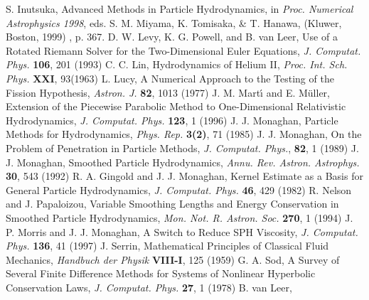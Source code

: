 \documentclass{cjour}
\begin{document}
\begin{article}
\begin{references}
 S. Inutsuka, 
              Advanced Methods in Particle Hydrodynamics, 
                 in {\it Proc. Numerical Astrophysics 1998}, 
                 eds. S. M. Miyama, K. Tomisaka, \& T. Hanawa, 
                 (Kluwer, Boston, 1999) , p. 367. 
 D. W. Levy, K. G. Powell, and B. van Leer,
                Use of a Rotated Riemann Solver for the 
                Two-Dimensional Euler Equations, 
                 {\it J. Computat. Phys.} {\bf 106}, 201 (1993)
 C. C. Lin, 
                Hydrodynamics of Helium II,  
                {\it Proc. Int. Sch. Phys.} {\bf XXI}, 93(1963) 
 L. Lucy, 
                A Numerical Approach to the Testing of 
                the Fission Hypothesis, 
                 {\it Astron. J.} {\bf 82}, 1013 (1977)
 J. M. Mart\'{\i} and E. M\"{u}ller, 
                Extension of the Piecewise Parabolic Method to 
                One-Dimensional Relativistic Hydrodynamics, 
                 {\it J. Computat. Phys.} {\bf 123}, 1 (1996)
 J. J. Monaghan, 
                 Particle Methods for Hydrodynamics, 
                {\it Phys. Rep.} {\bf 3(2)}, 71 (1985)
 J. J. Monaghan, 
                 On the Problem of Penetration in Particle Methods, 
                {\it J. Computat. Phys.}, {\bf 82}, 1 (1989)
 J. J. Monaghan, 
                 Smoothed Particle Hydrodynamics, 
                {\it Annu. Rev. Astron. Astrophys.} {\bf 30}, 543 (1992)
 R. A. Gingold and J. J. Monaghan, 
                 Kernel Estimate as a Basis for 
                 General Particle Hydrodynamics, 
                {\it J. Computat. Phys.} {\bf 46}, 429 (1982)
 R. Nelson and J. Papaloizou, 
                 Variable Smoothing Lengths and Energy Conservation 
                 in Smoothed Particle Hydrodynamics, 
                {\it Mon. Not. R. Astron. Soc.} {\bf 270}, 1 (1994) 
 J. P. Morris and J. J. Monaghan, 
                 A Switch to Reduce SPH Viscosity, 
                {\it J. Computat. Phys.} {\bf 136}, 41 (1997) 
 J. Serrin, 
                Mathematical Principles of Classical Fluid Mechanics, 
                {\it Handbuch der Physik} {\bf VIII-I}, 125 (1959) 
 G. A. Sod, 
                A Survey of Several Finite Difference Methods for 
                Systems of Nonlinear Hyperbolic Conservation Laws, 
                {\it J. Computat. Phys.} {\bf 27}, 1 (1978) 
 B. van Leer, 

\end{references}
\end{article}
\end{document}

